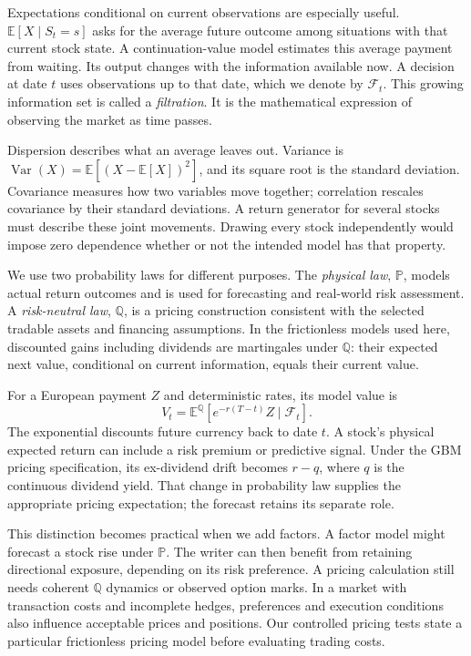 \documentclass[8pt]{strategynet-journal}
\newcommand{\E}{\mathbb{E}}
\newcommand{\Q}{\mathbb{Q}}
\newcommand{\PP}{\mathbb{P}}
\begin{document}
\begin{SNcolumns}
Expectations conditional on current observations are especially useful.
$\E[X\mid S_t=s]$ asks for the average future outcome among situations with
that current stock state. A continuation-value model estimates this average
payment from waiting. Its output changes with the information available now.
A decision at date $t$ uses observations up to that date, which we denote by
$\mathcal F_t$. This growing information set is called a \emph{filtration}.
It is the mathematical expression of observing the market as time passes.

Dispersion describes what an average leaves out. Variance is
$\operatorname{Var}(X)=\E[(X-\E[X])^2]$, and its square root is the standard
deviation. Covariance measures how two variables move together; correlation
rescales covariance by their standard deviations. A return generator for
several stocks must describe these joint movements. Drawing every stock
independently would impose zero dependence whether or not the intended
model has that property.

We use two probability laws for different purposes. The \emph{physical law},
$\PP$, models actual return outcomes and is used for forecasting and
real-world risk assessment. A \emph{risk-neutral law}, $\Q$, is a pricing
construction consistent with the selected tradable assets and financing
assumptions. In the frictionless models used here, discounted gains including
dividends are martingales under $\Q$: their expected next value, conditional
on current information, equals their current value.

For a European payment $Z$ and deterministic rates, its model value is
\[
 V_t=\E^{\Q}[e^{-r(T-t)}Z\mid\mathcal F_t].
\]
The exponential discounts future currency back to date $t$. A stock's physical
expected return can include a risk premium or predictive signal. Under the
GBM pricing specification, its ex-dividend drift becomes $r-q$, where $q$
is the continuous dividend yield. That change in probability law supplies
the appropriate pricing expectation; the forecast retains its separate role.

This distinction becomes practical when we add factors. A factor model might
forecast a stock rise under $\PP$. The writer can then benefit from retaining
directional exposure, depending on its risk preference. A pricing calculation
still needs coherent $\Q$ dynamics or observed option marks. In a market with
transaction costs and incomplete hedges, preferences and execution conditions
also influence acceptable prices and positions. Our controlled pricing tests
state a particular frictionless pricing model before evaluating trading costs.


\end{SNcolumns}
\end{document}
